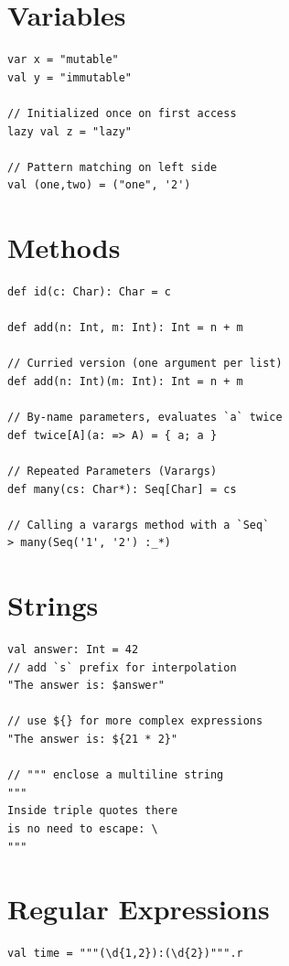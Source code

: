 \documentclass[10pt,landscape,a4paper]{article}
\begin{document}

\small
\begin{multicols*}{4}

  \section{Variables}
\begin{verbatim}
var x = "mutable"
val y = "immutable"

// Initialized once on first access
lazy val z = "lazy"

// Pattern matching on left side
val (one,two) = ("one", '2')
\end{verbatim}

  \section{Methods}
\begin{verbatim}
def id(c: Char): Char = c

def add(n: Int, m: Int): Int = n + m

// Curried version (one argument per list)
def add(n: Int)(m: Int): Int = n + m

// By-name parameters, evaluates `a` twice
def twice[A](a: => A) = { a; a }

// Repeated Parameters (Varargs)
def many(cs: Char*): Seq[Char] = cs

// Calling a varargs method with a `Seq`
> many(Seq('1', '2') :_*)
\end{verbatim}

  \section{Strings}

\begin{verbatim}
val answer: Int = 42
// add `s` prefix for interpolation
"The answer is: $answer"

// use ${} for more complex expressions
"The answer is: ${21 * 2}"

// """ enclose a multiline string
"""
Inside triple quotes there
is no need to escape: \
"""
\end{verbatim}

  \section{Regular Expressions}

\begin{verbatim}
val time = """(\d{1,2}):(\d{2})""".r


\end{verbatim}
\end{multicols*}
\end{document}
